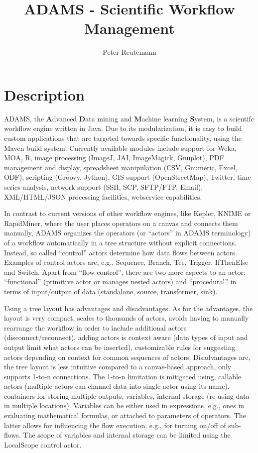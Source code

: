 \documentclass[a4paper,10pt]{article}
\title{ADAMS - Scientific Workflow Management}
\author{Peter Reutemann}
\begin{document}
\maketitle

\section{Description}
ADAMS, the \textbf{A}dvanced \textbf{D}ata mining and \textbf{M}achine learning \textbf{S}ystem, is a scientifc workflow engine written in Java. Due to its modularization, it is easy to build custom applications that are targeted towards specific functionality, using the Maven build system. Currently available modules include support for Weka, MOA, R, image processing (ImageJ, JAI, ImageMagick, Gnuplot), PDF management and display, spreadsheet manipulation (CSV, Gnumeric, Excel, ODF), scripting (Groovy, Jython), GIS support (OpenStreetMap), Twitter, time-series analysis, network support (SSH, SCP, SFTP/FTP, Email), XML/HTML/JSON processing facilities, webservice capabilities.

In contrast to current versions of other workflow engines, like Kepler, KNIME or RapidMiner, where the user places operators on a canvas and connects them manually, ADAMS organizes the operators (or ``actors'' in ADAMS terminology) of a workflow automatically in a tree structure without explicit connections. Instead, so called ``control'' actors determine how data flows between actors. Examples of control actors are, e.g., Sequence, Branch, Tee, Trigger, IfThenElse and Switch. Apart from ``flow control'', there are two more aspects to an actor: ``functional'' (primitive actor or manages nested actors) and ``procedural'' in terms of input/output of data (standalone, source, transformer, sink).

Using a tree layout has advantages and disadvantages. As for the advantages, the layout is very compact, scales to thousands of actors, avoids having to manually rearrange the workflow in order to include additional actors (disconnect/reconnect), adding actors is context aware (data types of input and output limit what actors can be inserted), customizable rules for suggesting actors depending on context for common sequences of actors. Disadvantages are, the tree layout is less intuitive compared to a canvas-based approach, only supports 1-to-n connections. The 1-to-n limitation is mitigated using, callable actors (multiple actors can channel data into single actor using its name), containers for storing multiple outputs, variables, internal storage (re-using data in multiple locations). Variables can be either used in expressions, e.g., ones in evaluating mathematical formulas, or attached to parameters of operators. The latter allows for influencing the flow execution, e.g., for turning on/off of sub-flows. The scope of variables and internal storage can be limited using the LocalScope control actor.
\end{document}
